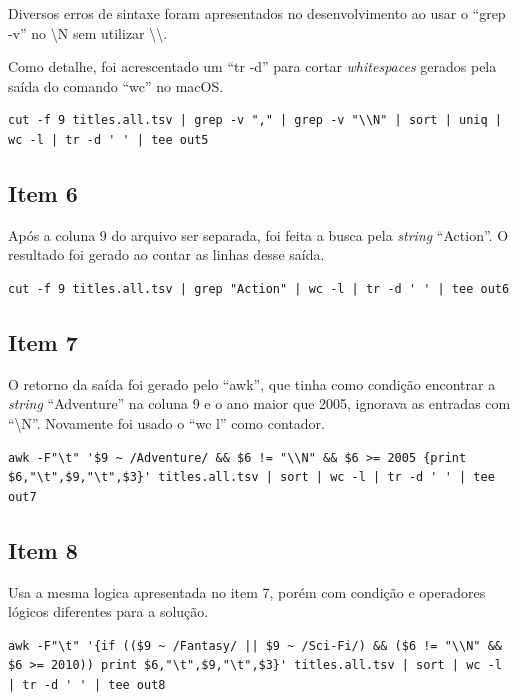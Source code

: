 \documentclass[12pt]{article}
\begin{document}
Diversos erros de  sintaxe foram apresentados no desenvolvimento ao usar o ``grep -v'' no \textbackslash N sem utilizar \textbackslash\textbackslash .

Como detalhe, foi acrescentado um ``tr -d'' para cortar \textit{whitespaces} gerados pela saída do comando ``wc'' no macOS.

\begin{verbatim}
cut -f 9 titles.all.tsv | grep -v "," | grep -v "\\N" | sort | uniq | wc -l | tr -d ' ' | tee out5 
\end{verbatim}

\subsection*{Item 6}

Após a coluna 9 do arquivo ser separada, foi feita a busca pela \textit{string}  ``Action''. O resultado foi gerado ao contar as linhas desse saída.

\begin{verbatim}
cut -f 9 titles.all.tsv | grep "Action" | wc -l | tr -d ' ' | tee out6
\end{verbatim}

\subsection*{Item 7}

O retorno da saída foi gerado pelo ``awk'', que tinha como condição encontrar a \textit{string} ``Adventure'' na coluna 9 e o ano maior que 2005, ignorava as entradas com ``\textbackslash N''. Novamente foi usado o ``wc l'' como contador.

\begin{verbatim}
awk -F"\t" '$9 ~ /Adventure/ && $6 != "\\N" && $6 >= 2005 {print $6,"\t",$9,"\t",$3}' titles.all.tsv | sort | wc -l | tr -d ' ' | tee out7
\end{verbatim}

\subsection*{Item 8}

Usa a mesma logica apresentada no item 7, porém com condição e operadores lógicos diferentes para a solução.

\begin{verbatim}
awk -F"\t" '{if (($9 ~ /Fantasy/ || $9 ~ /Sci-Fi/) && ($6 != "\\N" && $6 >= 2010)) print $6,"\t",$9,"\t",$3}' titles.all.tsv | sort | wc -l | tr -d ' ' | tee out8
\end{verbatim}
\end{document}
